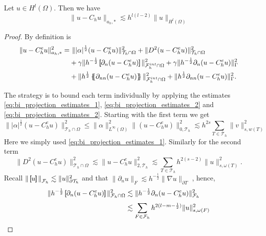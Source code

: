 \begin{lemma}
    Let $u \in H^{l}( \Omega ) $. Then we have  \[
    \|  u - C_{h}u \|_{ a_{h},*  }^{  } \lesssim h^{l(l-2)} \| u \|_{ H^{l}( \Omega )  }^{  }
    \]

\end{lemma}
\begin{proof}
    By definition is
    \[
        \begin{split}
            \| u - C_{h}^{e}u \|_{ a_{h}, * }^{  2}  =& \ \| |\alpha |^{\frac{1}{2}} ( u - C_{h}^{e}u) \|_{ \mathcal{T} _{h} \cap \Omega  }^{ 2}  + \| D^2 ( u - C_{h}^{e}u ) \|_{\mathcal{T} _{h} \cap \Omega   }^{ 2 } \\  &  + \gamma \| h^{-\frac{1}{2}} \jump{ \partial _{n} (u -
        C_{h}^{e} u) }   \|_{ \mathcal{F}_{h}^{int}\cap \Omega    }^{ 2
        } + \gamma \| h^{-\frac{1}{2}}  \partial _{n} (u - C_{h}^{e}u)    \|_{ \Gamma   }^{ 2 } \\
          & + \| h^{\frac{1}{2}} \mean{ \partial _{nn} (u - C_{h}^{e}u) }   \|_{\mathcal{F} _{h}^{int} \cap \Omega   }^{  2} +  \| h^{\frac{1}{2}} \partial _{nn}(u - C_{h}^{e}u)     \|_{ \Gamma }^{  2}.
        \end{split}
    \]

    The strategy is to bound each term individually by applying the estimates \eqref{eq:bi_projection_estimates_1}, \eqref{eq:bi_projection_estimates_2} and \eqref{eq:bi_projection_estimates_2}.
    Starting with the first term we get
    \[
            \| |\alpha |^{\frac{1}{2}} ( u - C_{h}^{e}u) \|_{ \mathcal{T} _{h} \cap \Omega  }^{ 2}  \le  \| \alpha  \|_{L^\infty ( \Omega )    }^{2  }   \|  ( u - C_{h}^{e}u) \|_{0,\mathcal{T} _{h}  }^{ 2} \lesssim  h^{2s} \sum_{T \in \mathcal{T}
            _{h}}^{}   \| v \|_{s,w( T)  }^{  2}
    \]
    Here we simply used \eqref{eq:bi_projection_estimates_1}.
    Similarly for the second term \[
    \| D^2 ( u - C_{h}^{e}u ) \|_{\mathcal{T} _{h} \cap \Omega   }^{ 2 } \lesssim  \|  u - C_{h}^{e}u  \|_{2,\mathcal{T} _{h}   }^{ 2 } \lesssim \sum_{T \in \mathcal{T} _{h}}^{} h^{2(s-2)} \| u \|_{ s, \omega ( T)  }^{ 2 }.
    \]
    Recall $\| \left[\!\!\left[  u  \right]\!\!\right]   \|_{ \mathcal{F} _{h} }^{  }  \lesssim  \| u \|_{ \partial\mathcal{T }_{h}  }^{2  }  $ and that $\| \partial _{n} u \|_{ F  }^{} \lesssim h^{-\frac{1}{2}} \| \nabla u \|_{ \partial T }^{  }  $ , hence, \[
        \begin{split}
    \| h^{-\frac{1}{2}} \left[\!\!\left[  \partial _{n} ( u - C_{h}^{e}u )  \right]\!\!\right]   \|_{ \mathcal{F}_{h} \cap \Omega   }^{  2}   &\lesssim \| h^{-\frac{1}{2}}  \partial _{n} ( u - C_{h}^{e}u )    \|_{ \mathcal{F}_{h} }^{2  }     \\
                                                                                                                 &
                                                                                                                 \lesssim \sum_{F \in \mathcal{F}_{h} }^{}
                                                                                                                 h^{ 2(l - m - \frac{1}{2}) } \| u      \|_{ s, \omega ( F)  }^{  2}
        \end{split}
    \]


\end{proof}
